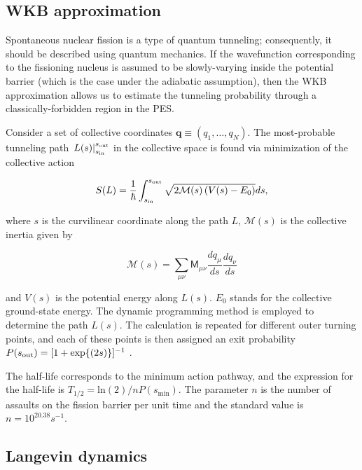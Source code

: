 \subsection{WKB approximation}\label{sect:wkb}
Spontaneous nuclear fission is a type of quantum tunneling; consequently, it should be described using quantum mechanics. If the wavefunction corresponding to the fissioning nucleus is assumed to be slowly-varying inside the potential barrier (which is the case under the adiabatic assumption), then the WKB approximation allows us to estimate the tunneling probability through a classically-forbidden region in the PES.

Consider a set of collective coordinates $\mathbf{q}\equiv(q_1, \ldots, q_N)$. The most-probable tunneling path $\left. L(s) \right|_{s_{\rm in}}^{s_{\rm out}}$ in the collective space is found via minimization of the collective action

\begin{equation}\label{eq:action} 
S(L) = \frac{1}{\hbar}\int_{s_{\rm in}}^{s_{\rm out}} \sqrt{2\mathcal{M}(s)\left(V(s)-E_0\right)}ds,
\end{equation} 

\noindent where $s$ is the curvilinear coordinate along the path $L$,
$\mathcal{M}(s)$ is the collective inertia given by \cite{Sadhukhan2013}

\begin{equation}
\mathcal{M}(s) = \sum_{\mu\nu} \mathsf{M}_{\mu\nu} \frac{dq_\mu}{ds} \frac{dq_\nu}{ds}
\end{equation}

\noindent and $V(s)$ is the potential energy along $L(s)$. $E_0$ stands for the collective ground-state
energy. The dynamic programming method \cite{Baran1981} is employed to determine
the path $L(s)$. The calculation is repeated for different outer turning points,
and each of these points is then assigned an exit  probability $P(s_{\rm out})=[1+\exp{(2s)}]^{-1}$ \cite{Baran1978}. 

The half-life corresponds to the minimum action pathway, and the expression for the half-life is $T_{1/2} = \mathrm{ln}(2)/nP(s_\mathrm{min})$. The parameter $n$ is the number of assaults on the fission barrier per unit time and the standard value is $n=10^{20.38} s^{-1}$.

\subsection{Langevin dynamics}

